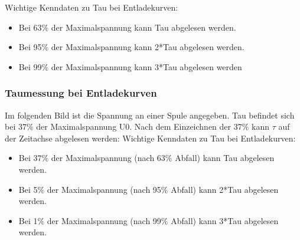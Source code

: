 \begin{center}
\end{center}
Wichtige Kenndaten zu Tau bei Entladekurven:
\begin{itemize}
    \item Bei 63$\%$ der Maximalspannung kann Tau abgelesen werden.
    \item Bei 95$\%$ der Maximalspannung kann 2*Tau abgelesen werden.
    \item Bei 99$\%$ der Maximalspannung kann 3*Tau abgelesen werden
\end{itemize}
\subsubsection{Taumessung bei Entladekurven}
Im folgenden Bild ist die Spannung an einer Spule angegeben. Tau befindet sich bei 37$\%$ der Maximalspannung U0. Nach dem Einzeichnen der 37$\%$ kann $\tau$ auf der Zeitachse abgelesen werden:
Wichtige Kenndaten zu Tau bei Entladekurven:
\begin{itemize}
    \item Bei 37$\%$ der Maximalspannung (nach 63$\%$ Abfall) kann Tau abgelesen werden.
    \item Bei 5$\%$ der Maximalspannung (nach 95$\%$ Abfall) kann 2*Tau abgelesen werden.
    \item Bei 1$\%$ der Maximalspannung (nach 99$\%$ Abfall) kann 3*Tau abgelesen werden.
\end{itemize}
